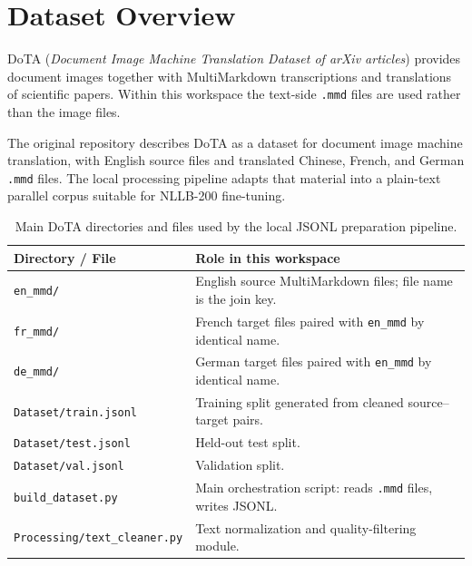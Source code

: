 \documentclass[12pt,a4paper]{article}
\begin{document}
\section{Dataset Overview}

DoTA (\emph{Document Image Machine Translation Dataset of arXiv articles}) provides document images together with MultiMarkdown transcriptions and translations of scientific papers. Within this workspace the text-side \texttt{.mmd} files are used rather than the image files.

The original repository describes DoTA as a dataset for document image machine translation, with English source files and translated Chinese, French, and German \texttt{.mmd} files. The local processing pipeline adapts that material into a plain-text parallel corpus suitable for NLLB-200 fine-tuning.

\begin{table}[H]
\centering
\caption{Main DoTA directories and files used by the local JSONL preparation pipeline.}
\label{tab:dota-layout}
\renewcommand{\arraystretch}{1.25}
\begin{tabularx}{\linewidth}{lX}
\toprule
\textbf{Directory / File} & \textbf{Role in this workspace} \\
\midrule
\texttt{en\_mmd/}                        & English source MultiMarkdown files; file name is the join key. \\
\texttt{fr\_mmd/}                        & French target files paired with \texttt{en\_mmd} by identical name. \\
\texttt{de\_mmd/}                        & German target files paired with \texttt{en\_mmd} by identical name. \\
\texttt{Dataset/train.jsonl}             & Training split generated from cleaned source–target pairs. \\
\texttt{Dataset/test.jsonl}              & Held-out test split. \\
\texttt{Dataset/val.jsonl}               & Validation split. \\
\texttt{build\_dataset.py}               & Main orchestration script: reads \texttt{.mmd} files, writes JSONL. \\
\texttt{Processing/text\_cleaner.py}     & Text normalization and quality-filtering module. \\
\bottomrule
\end{tabularx}
\end{table}
\end{document}
